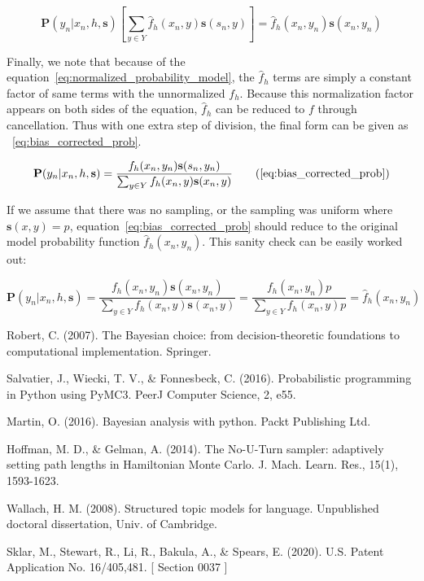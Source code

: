 \documentclass[twoside]{article}
\begin{document}
\begin{appendices}
\[\mathbf{P}(y_n|x_n,h,\mathbf{s})\left [\sum_{y \in Y}\hat{f}_h(x_n,y)\mathbf{s}(s_n,y) \right ]=\hat{f}_h(x_n,y_n)\mathbf{s}(x_n,y_n) \]

Finally, we note that because of the equation~\eqref{eq:normalized_probability_model}, the \(\hat{f}_h\) terms are simply a constant factor of same terms with the unnormalized \(f_h\). Because this normalization factor appears on both sides of the equation, \(\hat{f}_h\) can be reduced to \(f\) through cancellation. Thus with one extra step of division, the final form can be given as ~\eqref{eq:bias_corrected_prob}.

\begin{equation}
\mathbf{P}(y_n|x_n,h,\mathbf{s})=\dfrac{f_h(x_n,y_n)\mathbf{s}(s_n,y_n)}{\sum_{y \in Y}f_h(x_n,y)\mathbf{s}(x_n,y)}
\tag{\ref{eq:bias_corrected_prob}}
\end{equation}

If we assume that there was no sampling, or the sampling was uniform where \(\mathbf{s}(x,y)=p\), equation~\eqref{eq:bias_corrected_prob} should reduce to the original model probability function \(\hat{f}_h(x_n,y_n)\). This sanity check can be easily worked out:

\[\mathbf{P}(y_n|x_n,h,\mathbf{s})=\frac{f_h(x_n,y_n)\mathbf{s}(x_n,y_n)}{\sum_{y \in Y}f_h(x_n,y)\mathbf{s}(x_n,y)}=\frac{f_h(x_n,y_n)p}{\sum_{y \in Y}f_h(x_n,y)p} =\hat{f}_h(x_n,y_n)\]

\end{appendices}


\begin{thebibliography}{20}

Robert, C. (2007). The Bayesian choice: from decision-theoretic foundations to computational implementation. Springer.

Salvatier, J., Wiecki, T. V., \& Fonnesbeck, C. (2016). Probabilistic programming in Python using PyMC3. PeerJ Computer Science, 2, e55.

Martin, O. (2016). Bayesian analysis with python. Packt Publishing Ltd.

Hoffman, M. D., \& Gelman, A. (2014). The No-U-Turn sampler: adaptively setting path lengths in Hamiltonian Monte Carlo. J. Mach. Learn. Res., 15(1), 1593-1623.

Wallach, H. M. (2008). Structured topic models for language. Unpublished doctoral dissertation, Univ. of Cambridge.

Sklar, M., Stewart, R., Li, R., Bakula, A., \& Spears, E. (2020). U.S. Patent Application No. 16/405,481. [ Section 0037 ]

\end{thebibliography}
\end{document}

